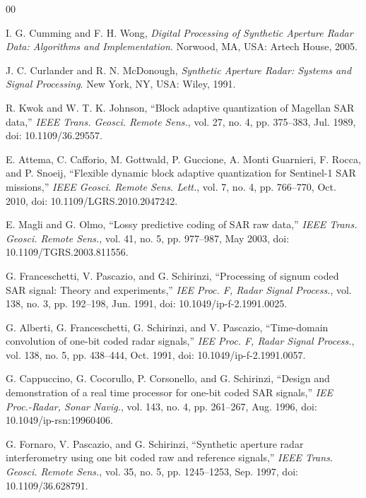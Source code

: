 \documentclass[conference]{IEEEtran}
\begin{document}
\begin{thebibliography}{00}

I. G. Cumming and F. H. Wong, \textit{Digital Processing of Synthetic Aperture Radar Data: Algorithms and Implementation}. Norwood, MA, USA: Artech House, 2005.

J. C. Curlander and R. N. McDonough, \textit{Synthetic Aperture Radar: Systems and Signal Processing}. New York, NY, USA: Wiley, 1991.

R. Kwok and W. T. K. Johnson, ``Block adaptive quantization of Magellan SAR data,'' \textit{IEEE Trans. Geosci. Remote Sens.}, vol. 27, no. 4, pp. 375--383, Jul. 1989, doi: 10.1109/36.29557.

E. Attema, C. Cafforio, M. Gottwald, P. Guccione, A. Monti Guarnieri, F. Rocca, and P. Snoeij, ``Flexible dynamic block adaptive quantization for Sentinel-1 SAR missions,'' \textit{IEEE Geosci. Remote Sens. Lett.}, vol. 7, no. 4, pp. 766--770, Oct. 2010, doi: 10.1109/LGRS.2010.2047242.

E. Magli and G. Olmo, ``Lossy predictive coding of SAR raw data,'' \textit{IEEE Trans. Geosci. Remote Sens.}, vol. 41, no. 5, pp. 977--987, May 2003, doi: 10.1109/TGRS.2003.811556.

G. Franceschetti, V. Pascazio, and G. Schirinzi, ``Processing of signum coded SAR signal: Theory and experiments,'' \textit{IEE Proc. F, Radar Signal Process.}, vol. 138, no. 3, pp. 192--198, Jun. 1991, doi: 10.1049/ip-f-2.1991.0025.

G. Alberti, G. Franceschetti, G. Schirinzi, and V. Pascazio, ``Time-domain convolution of one-bit coded radar signals,'' \textit{IEE Proc. F, Radar Signal Process.}, vol. 138, no. 5, pp. 438--444, Oct. 1991, doi: 10.1049/ip-f-2.1991.0057.

G. Cappuccino, G. Cocorullo, P. Corsonello, and G. Schirinzi, ``Design and demonstration of a real time processor for one-bit coded SAR signals,'' \textit{IEE Proc.-Radar, Sonar Navig.}, vol. 143, no. 4, pp. 261--267, Aug. 1996, doi: 10.1049/ip-rsn:19960406.

G. Fornaro, V. Pascazio, and G. Schirinzi, ``Synthetic aperture radar interferometry using one bit coded raw and reference signals,'' \textit{IEEE Trans. Geosci. Remote Sens.}, vol. 35, no. 5, pp. 1245--1253, Sep. 1997, doi: 10.1109/36.628791.


\end{thebibliography}
\end{document}
